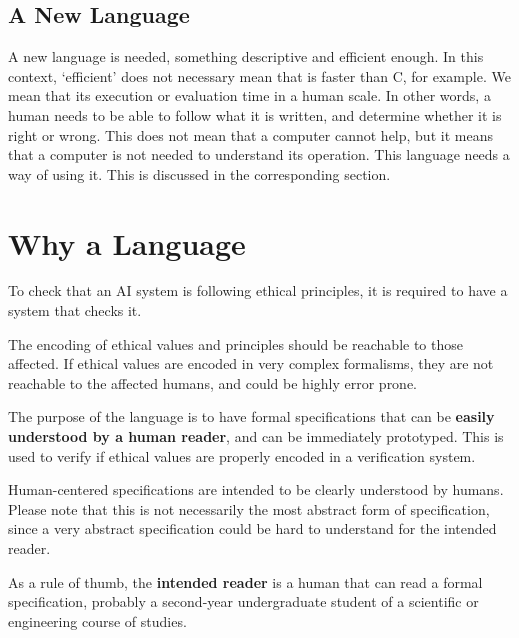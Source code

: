 \subsection{A New Language}

A new language is needed, something descriptive and efficient enough.
In this context, `efficient' does not necessary mean that is faster than C, for example.
We mean that its execution or evaluation time in a human scale.
In other words, a human needs to be able to follow what it is written, and determine whether it is right or wrong.
This does not mean that a computer cannot help, but it means that a computer is not needed to understand its operation.
This language needs a way of using it.
This is discussed in the corresponding section.



\section{Why a Language}

To check that an AI system is following ethical principles, it is required to have a system that checks it.

The encoding of ethical values and principles should be reachable to those affected.
If ethical values are encoded in very complex formalisms, they are not reachable to the affected humans, and could be highly error prone.

The purpose of the language is to have formal specifications that can be \textbf{easily understood by a human reader}, and can be immediately prototyped.
This is used to verify if ethical values are properly encoded in a verification system.

Human-centered specifications are intended to be clearly understood by humans.
Please note that this is not necessarily the most abstract form of specification, since a very abstract specification could be hard to understand for the intended reader.

As a rule of thumb, the \textbf{intended reader} is a human that can read a formal specification, probably a second-year undergraduate student of a scientific or engineering course of studies.

